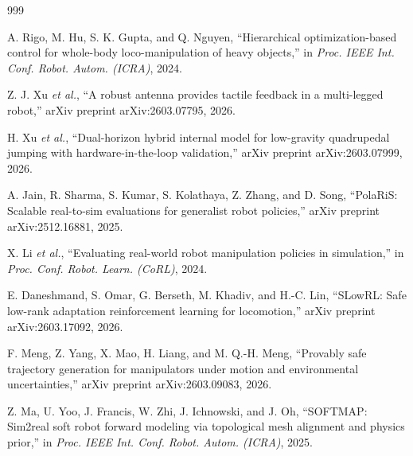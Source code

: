 \documentclass[11pt,a4paper]{article}
\begin{document}
\begin{thebibliography}{999}

A. Rigo, M. Hu, S. K. Gupta, and Q. Nguyen, ``Hierarchical optimization-based control for whole-body loco-manipulation of heavy objects,'' in \textit{Proc. IEEE Int. Conf. Robot. Autom. (ICRA)}, 2024.




Z. J. Xu \textit{et al.}, ``A robust antenna provides tactile feedback in a multi-legged robot,'' arXiv preprint arXiv:2603.07795, 2026.




H. Xu \textit{et al.}, ``Dual-horizon hybrid internal model for low-gravity quadrupedal jumping with hardware-in-the-loop validation,'' arXiv preprint arXiv:2603.07999, 2026.




A. Jain, R. Sharma, S. Kumar, S. Kolathaya, Z. Zhang, and D. Song, ``{PolaRiS}: Scalable real-to-sim evaluations for generalist robot policies,'' arXiv preprint arXiv:2512.16881, 2025.




X. Li \textit{et al.}, ``Evaluating real-world robot manipulation policies in simulation,'' in \textit{Proc. Conf. Robot. Learn. (CoRL)}, 2024.




E. Daneshmand, S. Omar, G. Berseth, M. Khadiv, and H.-C. Lin, ``{SLowRL}: Safe low-rank adaptation reinforcement learning for locomotion,'' arXiv preprint arXiv:2603.17092, 2026.




F. Meng, Z. Yang, X. Mao, H. Liang, and M. Q.-H. Meng, ``Provably safe trajectory generation for manipulators under motion and environmental uncertainties,'' arXiv preprint arXiv:2603.09083, 2026.




Z. Ma, U. Yoo, J. Francis, W. Zhi, J. Ichnowski, and J. Oh, ``{SOFTMAP}: Sim2real soft robot forward modeling via topological mesh alignment and physics prior,'' in \textit{Proc. IEEE Int. Conf. Robot. Autom. (ICRA)}, 2025.




\end{thebibliography}
\end{document}
